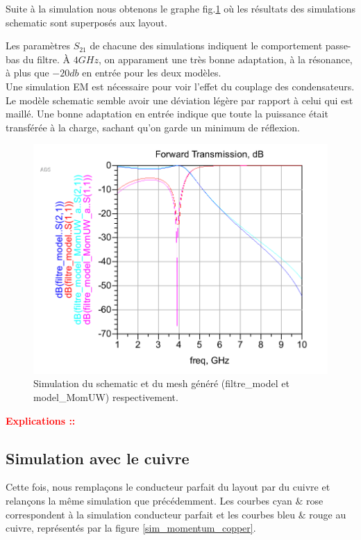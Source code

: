 \documentclass[a4paper]{article}
\begin{document}
Suite \`a la simulation nous obtenons le graphe fig.\ref{sim_schematic_momentum} o\`u les r\'esultats des simulations
schematic sont superpos\'es aux layout.


Les param\`etres $S_{21}$ de chacune des simulations indiquent le comportement passe-bas du filtre. \`A $4 GHz$,
on apparament une tr\`es bonne adaptation, \`a la r\'esonance, \`a plus que $-20 db$ en entr\'ee pour les deux mod\`eles.
\\
Une simulation EM est n\'ecessaire pour voir l'effet du couplage des condensateurs.\\

Le mod\`ele schematic semble avoir une d\'eviation l\'eg\`ere par rapport \`a celui qui est maill\'e.
Une bonne adaptation en entr\'ee indique que toute la puissance \'etait transf\'er\'ee \`a la charge, sachant qu'on garde
un minimum de r\'eflexion.

\clearpage

\begin{figure}[!htb]
\begin{center}
  \includegraphics[scale=0.35]{schematic_mesh.png}
  \caption{Simulation du schematic et du mesh g\'en\'er\'e (filtre\_model et model\_MomUW) respectivement.}
  \label{sim_schematic_momentum}
\end{center}
\end{figure}

\textbf{\textcolor{red}{Explications ::}}

\subsection{Simulation avec le cuivre}
Cette fois, nous rempla\c cons le conducteur parfait du layout par du cuivre et relan\c cons la m\^eme simulation que pr\'ec\'edemment.
Les courbes cyan $\&$ rose correspondent \`a la simulation conducteur parfait et les courbes bleu $\&$ rouge au cuivre, repr\'esent\'es
par la figure \ref{sim_momentum_copper}.
\end{document}
